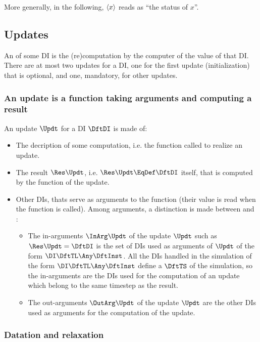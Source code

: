 More generally, in the following, $\left< x \right>$ reads as ``the status of $x$''.



\subsection{Updates}

An  of some DI is the (re)computation by the \CxSOM computer of the value of that DI. There are at most two updates for a DI, one for the first update (initialization) that is optional, and one, mandatory, for other updates.

\subsubsection{An update is a function taking arguments and computing a result \label{sec:update}}

An update $\Updt$ for a DI $\DftDI$ is made of:
\begin{itemize}
\item The decription of some computation, i.e. the function called to realize an update.
\item The result $\Res\Updt$, i.e. $\Res\Updt\EqDef\DftDI$ itself, that is computed by the function of the update.
\item Other DIs, thats serve as arguments to the function (their value is read when the function is called). Among arguments, a distinction is made between  and :
  \begin{itemize}
    \item The in-arguments $\InArg\Updt$ of the update $\Updt$ such as $\Res\Updt = \DftDI$ is the set of DIs used as arguments of $\Updt$ of the form $\DI\DftTL\Any\DftInst$. All the DIs handled in the simulation of the form $\DI\DftTL\Any\DftInst$ define a  $\DftTS$ of the simulation, so the in-arguments are the DIs used for the computation of an update which belong to the same timestep as the result.
    \item The out-arguments  $\OutArg\Updt$ of the update $\Updt$ are the other DIs used as arguments for the computation of the update.
  \end{itemize}
\end{itemize}

\subsubsection{Datation and relaxation}

